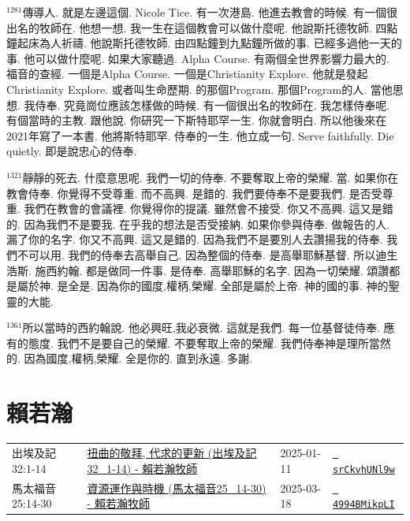 \documentclass{book}
\begin{document}
$^{1281}$傳導人.
就是左邊這個.
Nicole Tice.
有一次港島.
他進去教會的時候.
有一個很出名的牧師在.
他想一想.
我一生在這個教會可以做什麼呢.
他說斯托德牧師.
四點鐘起床為人祈禱.
他說斯托德牧師.
由四點鐘到九點鐘所做的事.
已經多過他一天的事.
他可以做什麼呢.
如果大家聽過.
Alpha Course.
有兩個全世界影響力最大的.
福音的查經.
一個是Alpha Course.
一個是Christianity Explore.
他就是發起Christianity Explore.
或者叫生命歷期.
的那個Program.
那個Program的人.
當他思想.
我侍奉.
究竟崗位應該怎樣做的時候.
有一個很出名的牧師在.
我怎樣侍奉呢.
有個當時的主教.
跟他說.
你研究一下斯特耶罕一生.
你就會明白.
所以他後來在2021年寫了一本書.
他將斯特耶罕.
侍奉的一生.
他立成一句.
Serve faithfully.
Die quietly.
即是說忠心的侍奉.

$^{1321}$靜靜的死去.
什麼意思呢.
我們一切的侍奉.
不要奪取上帝的榮耀.
當.
如果你在教會侍奉.
你覺得不受尊重.
而不高興.
是錯的.
我們要侍奉不是要我們.
是否受尊重.
我們在教會的會議裡.
你覺得你的提議.
雖然會不接受.
你又不高興.
這又是錯的.
因為我們不是要我.
在乎我的想法是否受接納.
如果你參與侍奉.
做報告的人.
漏了你的名字.
你又不高興.
這又是錯的.
因為我們不是要別人去讚揚我的侍奉.
我們不可以用.
我們的侍奉去高舉自己.
因為整個的侍奉.
是高舉耶穌基督.
所以迪生浩斯.
施西約翰.
都是做同一件事.
是侍奉.
高舉耶穌的名字.
因為一切榮耀.
頌讚都是屬於神.
是全是.
因為你的國度,權柄,榮耀.
全部是屬於上帝.
神的國的事.
神的聖靈的大能.

$^{1361}$所以當時的西約翰說.
他必興旺,我必衰微.
這就是我們.
每一位基督徒侍奉.
應有的態度.
我們不是要自己的榮耀.
不要奪取上帝的榮耀.
我們侍奉神是理所當然的.
因為國度,權柄,榮耀.
全是你的.
直到永遠.
多謝.
\newpage



\chapter{賴若瀚}\label{ch:preacher12}
\begin{multicols}{3}
\minitoc
\end{multicols}
{ \scriptsize


\begin{xltabular}{\textwidth}{|p{0.15\textwidth} p{0.6\textwidth}|p{0.07\textwidth} p{0.1\textwidth}|}
\hline
出埃及記 32:1-14 & \hyperref[sec:srCkvhUNl9w]{扭曲的敬拜, 代求的更新 (出埃及記32\_1-14) -  賴若瀚牧師} & 2025-01-11 & \href{https://youtube.com/watch?v=srCkvhUNl9w}{\texttt{ srCkvhUNl9w}} \\
馬太福音 25:14-30 & \hyperref[sec:4994BMikpLI]{資源運作與時機 (馬太福音25\_14-30) - 賴若瀚牧師} & 2025-03-18 & \href{https://youtube.com/watch?v=4994BMikpLI}{\texttt{ 4994BMikpLI}} \\
\hline
\end{xltabular}
}
\newpage
\end{document}
